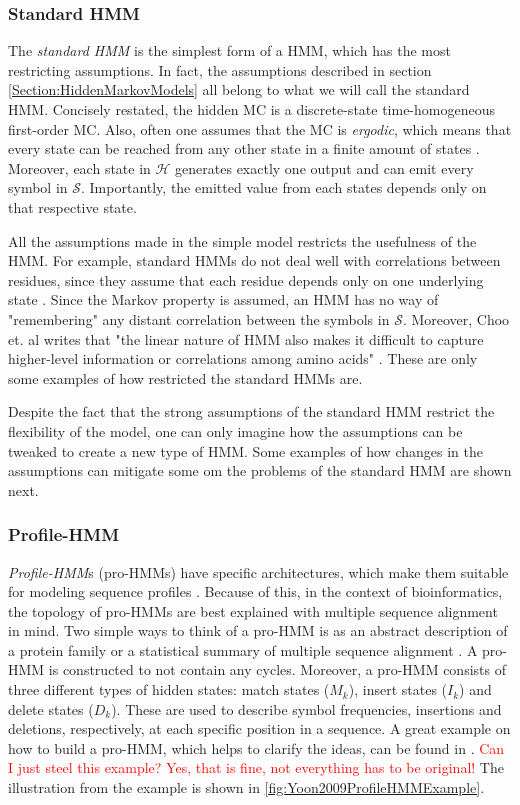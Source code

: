 \documentclass{article}\usepackage[]{graphicx}\usepackage[]{color}
\begin{document}
\subsubsection{Standard HMM}\label{Section:StandardHMM}
The \textit{standard HMM} is the simplest form of a HMM, which has the most restricting assumptions. In fact, the assumptions described in section \ref{Section:HiddenMarkovModels} all belong to what we will call the standard HMM. Concisely restated, the hidden MC is a discrete-state time-homogeneous first-order MC. Also, often one assumes that the MC is \textit{ergodic}, which means that every state can be reached from any other state in a finite amount of states \cite{Rabiner1989}. Moreover, each state in $\mathcal{H}$ generates exactly one output and can emit every symbol in $\mathcal{S}$. Importantly, the emitted value from each states depends only on that respective state. 

All the assumptions made in the simple model restricts the usefulness of the HMM. For example, standard HMMs do not deal well with correlations between residues, since they assume that each residue depends only on one underlying state \cite{Eddy04}. Since the Markov property is assumed, an HMM has no way of "remembering" any distant correlation between the symbols in $\mathcal{S}$. Moreover, Choo et. al writes that "the linear nature of HMM also makes it difficult to capture higher-level information or correlations among amino acids" \cite{Choo2004}. These are only some examples of how restricted the standard HMMs are. 

Despite the fact that the strong assumptions of the standard HMM restrict the flexibility of the model, one can only imagine how the assumptions can be tweaked to create a new type of HMM. Some examples of how changes in the assumptions can mitigate some om the problems of the standard HMM are shown next.  

\subsubsection{Profile-HMM}\label{Section:Profile-HMM}
\textit{Profile-HMM}s (pro-HMMs) have specific architectures, which make them suitable for modeling sequence profiles \cite{Yoon2009}. Because of this, in the context of bioinformatics, the topology of pro-HMMs are best explained with multiple sequence alignment in mind. Two simple ways to think of a pro-HMM is as an abstract description of a protein family or a statistical summary of multiple sequence alignment \cite{Christianini2006}. A pro-HMM is constructed to not contain any cycles. Moreover, a pro-HMM consists of three different types of hidden states: match states ($M_k$), insert states ($I_k$) and delete states ($D_k$). These are used to describe symbol frequencies, insertions and deletions, respectively, at each specific position in a sequence. A great example on how to build a pro-HMM, which helps to clarify the ideas, can be found in \cite{Yoon2009}. \textcolor{red}{Can I just steel this example? Yes, that is fine, not everything has to be original!} The illustration from the example is shown in \ref{fig:Yoon2009ProfileHMMExample}.
\end{document}
